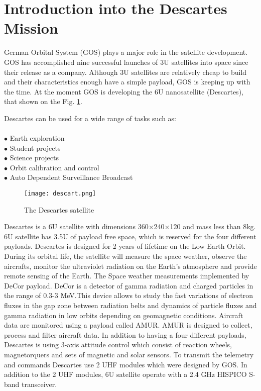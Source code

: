 \section{Introduction into the Descartes Mission}

German Orbital System (GOS) plays a major role in the satellite development. GOS has accomplished nine successful launches of 3U satellites into space since their release as a company. Although 3U satellites are relatively cheap to build and their characteristics enough have a simple payload, GOS is keeping up with the time. At the moment GOS is developing the 6U nanosatellite (Descartes), that shown on the Fig. \ref{fig: EPS222}. 

Descartes can be used for a wide range of tasks such as:\\ \\
$\bullet$ Earth exploration\\ 
$\bullet$ Student projects\\ 
$\bullet$ Science projects\\ 
$\bullet$ Orbit calibration and control\\ 
$\bullet$ Auto Dependent Surveillance Broadcast\\ 



\begin{figure}[h]
	\centering
	\texttt{[image: descart.png]}
	\caption{The Descartes satellite}
	\label{fig: EPS222}
\end{figure}


  Descartes is a 6U satellite with dimensions 360$\times$240$\times$120 and mass less than 8kg. 6U satellite has 3.5U of payload free space, which is reserved for the four different payloads. Descartes is designed for 2 years of lifetime on the Low Earth Orbit. During its orbital life, the satellite will measure the space weather, observe the aircrafts, monitor the ultraviolet radiation on the Earth's atmosphere  and provide remote sensing of the Earth. The Space weather measurements implemented by DeCor payload. DeCor is a detector of gamma radiation and charged particles in the range of 0.3-3 MeV.This device allows to study the fast variations of electron fluxes in the gap zone between radiation belts and dynamics of particle fluxes and gamma radiation in low orbits depending on geomagnetic conditions. Aircraft data are monitored using a payload called AMUR. AMUR is designed to collect, process and filter aircraft data. 
  In addition to having a four different payloads, Descartes is using 3-axis attitude control which consist of reaction wheels, magnetorquers and sets of magnetic and solar sensors. To transmit the telemetry and commands Descartes use 2 UHF modules which were designed by GOS. In addition to the 2 UHF modules, 6U satellite operate with a 2.4 GHz HISPICO S-band transceiver.\\ \\
 

